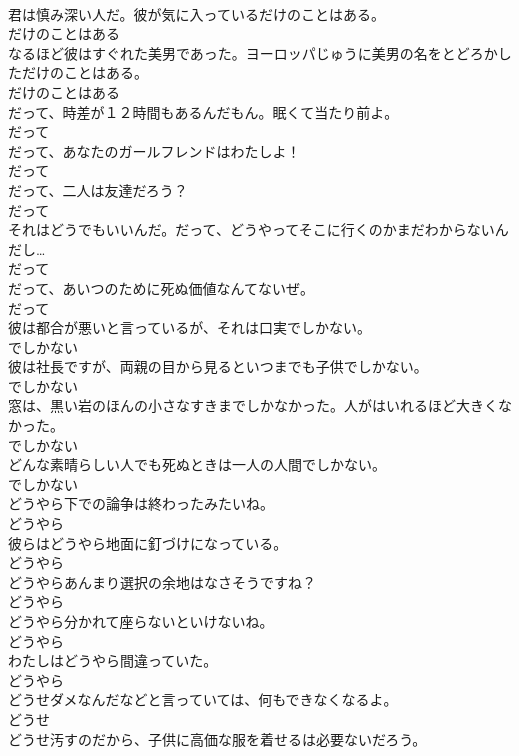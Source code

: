 \documentclass[8pt]{extreport}
\begin{document}
\begin{CJK}{UTF8}{min}
\\	君は慎み深い人だ。彼が気に入っているだけのことはある。	
\\	だけのことはある
\\	なるほど彼はすぐれた美男であった。ヨーロッパじゅうに美男の名をとどろかしただけのことはある。	
\\	だけのことはある
\\	だって、時差が１２時間もあるんだもん。眠くて当たり前よ。	
\\	だって
\\	だって、あなたのガールフレンドはわたしよ！	
\\	だって
\\	だって、二人は友達だろう？	
\\	だって
\\	それはどうでもいいんだ。だって、どうやってそこに行くのかまだわからないんだし…	
\\	だって
\\	だって、あいつのために死ぬ価値なんてないぜ。	
\\	だって
\\	彼は都合が悪いと言っているが、それは口実でしかない。	
\\	でしかない
\\	彼は社長ですが、両親の目から見るといつまでも子供でしかない。	
\\	でしかない
\\	窓は、黒い岩のほんの小さなすきまでしかなかった。人がはいれるほど大きくなかった。	
\\	でしかない
\\	どんな素晴らしい人でも死ぬときは一人の人間でしかない。	
\\	でしかない
\\	どうやら下での論争は終わったみたいね。	
\\	どうやら
\\	彼らはどうやら地面に釘づけになっている。	
\\	どうやら
\\	どうやらあんまり選択の余地はなさそうですね？	
\\	どうやら
\\	どうやら分かれて座らないといけないね。	
\\	どうやら
\\	わたしはどうやら間違っていた。	
\\	どうやら
\\	どうせダメなんだなどと言っていては、何もできなくなるよ。	
\\	どうせ
\\	どうせ汚すのだから、子供に高価な服を着せるは必要ないだろう。	

\end{CJK}
\end{document}
